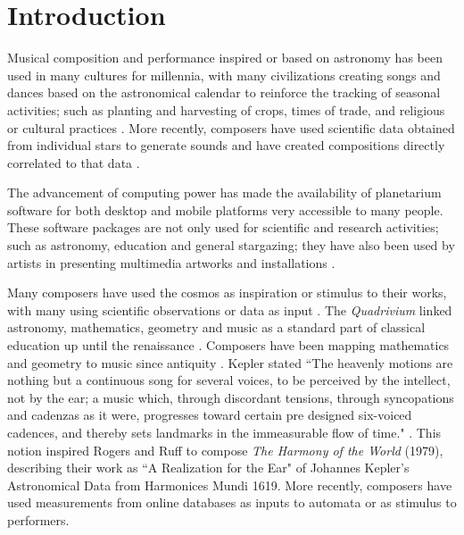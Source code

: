 \chapter{Introduction}
    Musical composition and performance inspired or based on astronomy has been used in many cultures for millennia, with many civilizations creating songs and dances based on the astronomical calendar to reinforce the tracking of seasonal activities; such as planting and harvesting of crops, times of trade, and religious or cultural practices \cite{ruggles2015handbook, deMello2015, Lima2015}.  More recently, composers  have used scientific data obtained from individual stars to generate sounds and have created compositions directly correlated to that data \cite{fraietta2014musical, BriightSyzygy}. 

The advancement of computing power has made the availability of planetarium software for both desktop and mobile platforms very accessible to many people. These software packages are not only used for scientific and research activities; such as astronomy, education and general stargazing; they have also been used by artists in presenting multimedia artworks and installations \cite{zotti2017skyscape,tuveri2013controlling}. 

Many composers have used the cosmos as inspiration or stimulus to their works, with many using scientific observations or data as input \cite{fraknoi2008music, fraietta2014musical}. The \textit{Quadrivium} linked astronomy, mathematics, geometry and music as a standard part of classical education up until the renaissance \cite{lundy2010quadrivium}. Composers have been mapping mathematics and geometry to music since antiquity \cite{james1995music, assayag2002mathematics}. Kepler stated ``The heavenly motions are nothing but a continuous song for several voices, to be perceived by the intellect, not by the ear; a music which, through discordant tensions, through syncopations and cadenzas as it were, progresses toward certain pre designed six-voiced cadences, and thereby sets landmarks in the immeasurable flow of time." \cite[cited in  ~286]{RojersRuffKepler}. This notion inspired Rogers and Ruff to compose \textit{The Harmony of the World} (1979), describing their work as ``A Realization for the Ear" \cite [p. 286]{RojersRuffKepler} of Johannes Kepler's Astronomical Data from Harmonices Mundi 1619.
More recently, composers have used measurements from online databases as inputs to automata or as stimulus to performers. 


